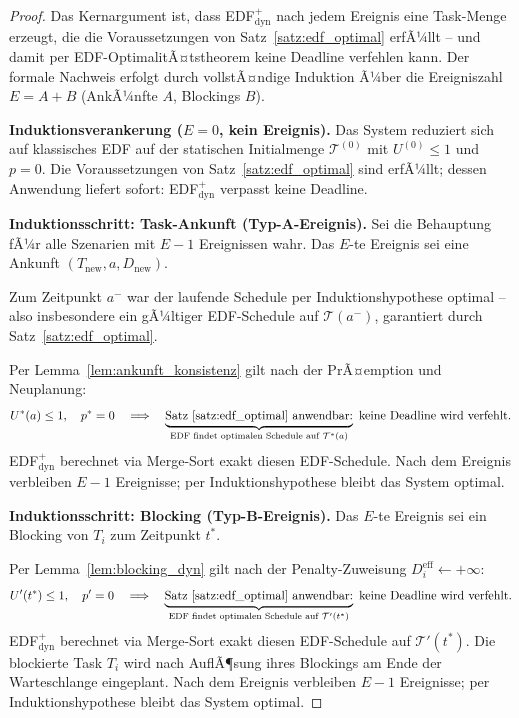 ﻿\documentclass[a4paper,12pt]{article}
\theoremstyle{definition}
\begin{document}
	\begin{proof}
		Das Kernargument ist, dass EDF$^+_{\mathrm{dyn}}$ nach jedem Ereignis
		eine Task-Menge erzeugt, die die Voraussetzungen von
		Satz~\ref{satz:edf_optimal} erfÃ¼llt -- und damit per
		EDF-OptimalitÃ¤tstheorem keine Deadline verfehlen kann.
		Der formale Nachweis erfolgt durch vollstÃ¤ndige Induktion Ã¼ber
		die Ereigniszahl $E = A + B$ (AnkÃ¼nfte $A$, Blockings $B$).

		\medskip
		\textbf{Induktionsverankerung ($E = 0$, kein Ereignis).}
		Das System reduziert sich auf klassisches EDF auf der statischen
		Initialmenge $\mathcal{T}^{(0)}$ mit $U^{(0)} \le 1$ und $p = 0$.
		Die Voraussetzungen von Satz~\ref{satz:edf_optimal} sind erfÃ¼llt;
		dessen Anwendung liefert sofort: EDF$^+_{\mathrm{dyn}}$ verpasst
		keine Deadline.

		\medskip
		\textbf{Induktionsschritt: Task-Ankunft (Typ-A-Ereignis).}
		Sei die Behauptung fÃ¼r alle Szenarien mit $E - 1$ Ereignissen wahr.
		Das $E$-te Ereignis sei eine Ankunft $(T_{\text{new}}, a, D_{\text{new}})$.

		Zum Zeitpunkt $a^-$ war der laufende Schedule per Induktionshypothese
		optimal -- also insbesondere ein gÃ¼ltiger EDF-Schedule auf
		$\mathcal{T}(a^-)$, garantiert durch Satz~\ref{satz:edf_optimal}.

		Per Lemma~\ref{lem:ankunft_konsistenz} gilt nach der PrÃ¤emption und
		Neuplanung:
		\[
		U^*(a) \le 1,\quad p^* = 0
		\quad\Longrightarrow\quad
		\underbrace{\text{Satz~\ref{satz:edf_optimal} anwendbar:}}_{\text{EDF findet optimalen Schedule auf }\mathcal{T}^*(a)}
		\text{ keine Deadline wird verfehlt.}
		\]
		EDF$^+_{\mathrm{dyn}}$ berechnet via Merge-Sort exakt diesen EDF-Schedule.
		Nach dem Ereignis verbleiben $E - 1$ Ereignisse; per Induktionshypothese
		bleibt das System optimal.

		\medskip
		\textbf{Induktionsschritt: Blocking (Typ-B-Ereignis).}
		Das $E$-te Ereignis sei ein Blocking von $T_i$ zum Zeitpunkt $t^*$.

		Per Lemma~\ref{lem:blocking_dyn} gilt nach der Penalty-Zuweisung
		$D_i^{\text{eff}} \leftarrow +\infty$:
		\[
		U'(t^*) \le 1,\quad p' = 0
		\quad\Longrightarrow\quad
		\underbrace{\text{Satz~\ref{satz:edf_optimal} anwendbar:}}_{\text{EDF findet optimalen Schedule auf }\mathcal{T}'(t^*)}
		\text{ keine Deadline wird verfehlt.}
		\]
		EDF$^+_{\mathrm{dyn}}$ berechnet via Merge-Sort exakt diesen EDF-Schedule
		auf $\mathcal{T}'(t^*)$. Die blockierte Task $T_i$ wird nach AuflÃ¶sung
		ihres Blockings am Ende der Warteschlange eingeplant.
		Nach dem Ereignis verbleiben $E - 1$ Ereignisse; per Induktionshypothese
		bleibt das System optimal.


\end{proof}
\end{document}
